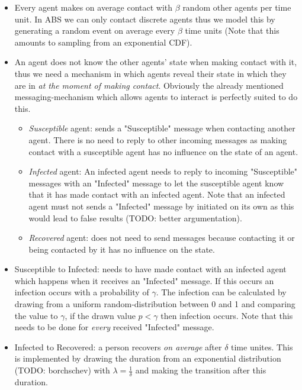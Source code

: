 \begin{itemize}
	\item Every agent makes on average contact with $\beta$ random other agents per time unit. In ABS we can only contact discrete agents thus we model this by generating a random event on average every $\beta$ time units (Note that this amounts to sampling from an exponential CDF).
	
	\item An agent does not know the other agents' state when making contact with it, thus we need a mechanism in which agents reveal their state in which they are in \textit{at the moment of making contact}. Obviously the already mentioned messaging-mechanism which allows agents to interact is perfectly suited to do this.
	\begin{itemize}
		\item \textit{Susceptible} agent: sends a "Susceptible" message when contacting another agent. There is no need to reply to other incoming messages as making contact with a susceptible agent has no influence on the state of an agent.
		\item \textit{Infected} agent: An infected agent needs to reply to incoming "Susceptible" messages with an "Infected" message to let the susceptible agent know that it has made contact with an infected agent. Note that an infected agent must not sends a "Infected" message by initiated on its own as this would lead to false results (TODO: better argumentation).
		\item \textit{Recovered} agent: does not need to send messages because contacting it or being contacted by it has no influence on the state.
	\end{itemize}
	
	\item Susceptible to Infected: needs to have made contact with an infected agent which happens when it receives an "Infected" message. If this occurs an infection occurs with a probability of $\gamma$. The infection can be calculated by drawing from a uniform random-distribution between 0 and 1 and comparing the value to $\gamma$, if the drawn value $p < \gamma$ then infection occurs. Note that this needs to be done for \textit{every} received "Infected" message.
	
	\item Infected to Recovered: a person recovers \textit{on average} after $\delta$ time unites. This is implemented by drawing the duration from an exponential distribution (TODO: borchschev) with $\lambda = \frac{1}{\delta}$ and making the transition after this duration.
\end{itemize}

